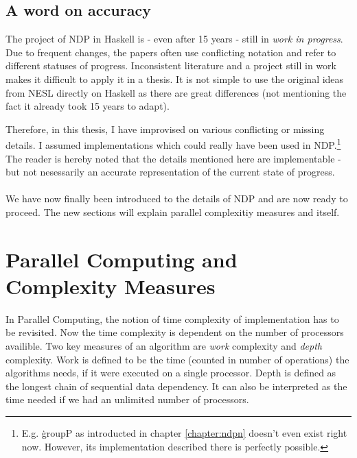   \subsection{A word on accuracy}
    The project of NDP in Haskell is - even after 15 years -
    still in \textit{work in progress}. Due to frequent changes,
    the papers often use conflicting notation and refer to
    different statuses of progress. Inconsistent literature and a project still in work makes it difficult
    to apply it in a thesis. It is not simple to use the original ideas from
    NESL directly on Haskell as there are great differences (not mentioning
    the fact it already took 15 years to adapt).
    
    Therefore, in this thesis, I have improvised on various conflicting or
    missing details. I assumed implementations which could really have been
    used in NDP.\footnote{E.g. \c{groupP} as introducted in chapter \ref{chapter:ndpn} doesn't
    even exist right now. However, its implementation described there is perfectly possible.}
    The reader is hereby noted that the details
    mentioned here are implementable - but not nesessarily an accurate
    representation of the current state of progress.
    
    
  \paragraph{}
    We have now finally been introduced to the details of NDP and
    are now ready to proceed. The new sections will explain
    parallel complexitiy measures and \algo itself.
  
  \clearpage
  
\section{Parallel Computing and Complexity Measures}
  In Parallel Computing, the notion of time complexity of implementation
  has to be revisited. Now the time complexity is dependent on the
  number of processors availible. Two key measures of
  an algorithm are \emph{work} complexity
  and \emph{depth} complexity. Work is defined
  to be the time (counted in number of operations)
  the algorithms needs, if it were executed on a single processor.
  Depth is defined as the longest chain of sequential data dependency.
  It can also be interpreted as the time needed if we had
  an unlimited number of processors.
  
